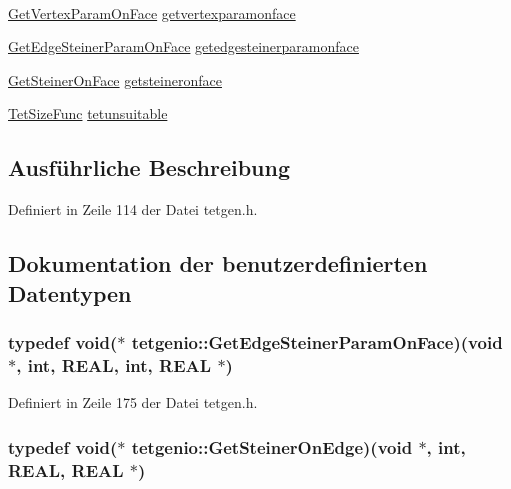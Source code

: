\begin{DoxyCompactItemize}
$$\item 
\hyperlink{classtetgenio_a722d4a1ab76513e917be3466b85bb78f}{Get\-Vertex\-Param\-On\-Face} \hyperlink{classtetgenio_abe5875cae7c00d505062e62e52e9a8dd}{getvertexparamonface}
\item 
\hyperlink{classtetgenio_a351895a0365ff101d0400f18e1145e76}{Get\-Edge\-Steiner\-Param\-On\-Face} \hyperlink{classtetgenio_adc6e23ad6a58080844e7096a60d667cf}{getedgesteinerparamonface}
\item 
\hyperlink{classtetgenio_a1f2d237a6b36007f8b3e3557cb9b5451}{Get\-Steiner\-On\-Face} \hyperlink{classtetgenio_a611b575fcfc845416f2d151afcf5c6aa}{getsteineronface}
\item 
\hyperlink{classtetgenio_aa1b228427a0bdabc66cead91dd4497b8}{Tet\-Size\-Func} \hyperlink{classtetgenio_ad57af35c7c480da03af06b1388a4a8f7}{tetunsuitable}
\end{DoxyCompactItemize}


\subsection{Ausführliche Beschreibung}


Definiert in Zeile 114 der Datei tetgen.\-h.



\subsection{Dokumentation der benutzerdefinierten Datentypen}
\hypertarget{classtetgenio_a351895a0365ff101d0400f18e1145e76}{
\subsubsection[{Get\-Edge\-Steiner\-Param\-On\-Face}]{\setlength{\rightskip}{0pt plus 5cm}typedef void($\ast$  tetgenio\-::\-Get\-Edge\-Steiner\-Param\-On\-Face)(void $\ast$, int, {\bf R\-E\-A\-L}, int, {\bf R\-E\-A\-L} $\ast$)}}\label{classtetgenio_a351895a0365ff101d0400f18e1145e76}


Definiert in Zeile 175 der Datei tetgen.\-h.

\hypertarget{classtetgenio_ab5ba46cbbf0dd7ebc4875fa70b7f1c65}{
\subsubsection[{Get\-Steiner\-On\-Edge}]{\setlength{\rightskip}{0pt plus 5cm}typedef void($\ast$  tetgenio\-::\-Get\-Steiner\-On\-Edge)(void $\ast$, int, {\bf R\-E\-A\-L}, {\bf R\-E\-A\-L} $\ast$)}}\label{classtetgenio_ab5ba46cbbf0dd7ebc4875fa70b7f1c65}


